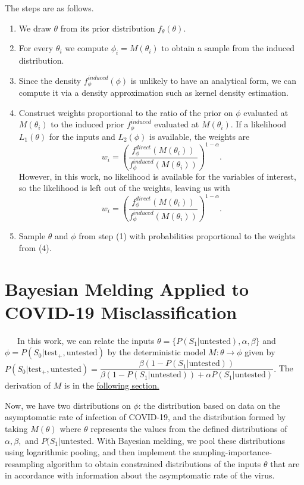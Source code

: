 \documentclass[12pt,twoside]{smiththesis}
\providecommand{\tightlist}{%
  \setlength{\itemsep}{0pt}\setlength{\parskip}{0pt}}
\begin{document}
The steps are as follows.
\begin{enumerate}
\def\labelenumi{\arabic{enumi}.}
\tightlist
\item
  We draw \(\theta\) from its prior distribution \(f_\theta(\theta)\).
\item
  For every \(\theta_i\) we compute \(\phi_i = M(\theta_i)\) to obtain a sample from the induced distribution.
\item
  Since the density \(f_\phi^{induced}(\phi)\) is unlikely to have an analytical form, we can compute it via a density approximation such as kernel density estimation.
\item
  Construct weights proportional to the ratio of the prior on \(\phi\) evaluated at \(M(\theta_i)\) to the induced prior \(f_\phi^{induced}\) evaluated at \(M(\theta_i)\). If a likelihood \(L_1(\theta)\) for the inputs and \(L_2(\phi)\) is available, the weights are
  \[w_i = \left( \frac{f_\phi^{direct}(M(\theta_i))}{f_\phi^{induced}(M(\theta_i))} \right)^{1-\alpha}.\]
  However, in this work, no likelihood is available for the variables of interest, so the likelihood is left out of the weights, leaving us with
  \[w_i = \left( \frac{f_\phi^{direct}(M(\theta_i))}{f_\phi^{induced}(M(\theta_i))} \right)^{1-\alpha}.\]
\item
  Sample \(\theta\) and \(\phi\) from step (1) with probabilities proportional to the weights from (4).
\end{enumerate}
\newpage

\hypertarget{meld}{%
\section{Bayesian Melding Applied to COVID-19 Misclassification}\label{meld}}

~~~In this work, we can relate the inputs \(\theta = \{P(S_1|\text{untested}), \alpha, \beta \}\) and \(\phi = P(S_0|\text{test}_+,\text{untested})\) by the deterministic model \(M: \theta \to \phi\) given by \(P(S_0|\text{test}_+, \text{untested}) = \dfrac{\beta(1 - P(S_1|\text{untested}))}{\beta(1-P(S_1|\text{untested})) + \alpha P(S_1|\text{untested})}.\) The derivation of \(M\) is in the \protect\hyperlink{derivation}{following section.}

Now, we have two distributions on \(\phi\): the distribution based on data on the asymptomatic rate of infection of COVID-19, and the distribution formed by taking \(M(\theta)\) where \(\theta\) represents the values from the defined distributions of \(\alpha,\beta,\) and \(P(S_1|\text{untested}\). With Bayesian melding, we pool these distributions using logarithmic pooling, and then implement the sampling-importance-resampling algorithm to obtain constrained distributions of the inputs \(\theta\) that are in accordance with information about the asymptomatic rate of the virus.
\end{document}
